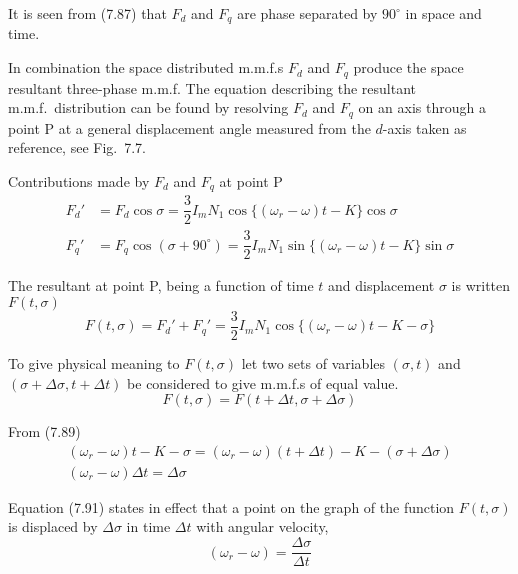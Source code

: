 \documentclass[a4paper,numbers=noenddot,12pt]{scrbook}
\begin{document}
        It is seen from (7.87) that $F_d$ and $F_q$ are phase separated by $90^{\circ}$ in space and time.

        In combination the space distributed m.m.f.s $F_d$ and $F_q$ produce the space resultant three-phase m.m.f. The equation describing the resultant m.m.f.\ distribution can be found by resolving $F_d$ and $F_q$ on an axis through a point P at a general displacement angle measured from the $d$-axis taken as reference, see Fig.\ 7.7.

        Contributions made by $F_d$ and $F_q$ at point P
        \begin{equation}
            \begin{aligned}
                F_d' & = F_d \cos \sigma = \dfrac{3}{2} I_m N_1 \cos \{(\omega_r - \omega)t - K\} \cos \sigma \\
                F_q' & = F_q \cos (\sigma + 90^{\circ}) = \dfrac{3}{2} I_m N_1 \sin \{(\omega_r - \omega)t - K\} \sin \sigma
            \end{aligned}
            \label{eq:Eq7.88}
        \end{equation}

        The resultant at point P, being a function of time $t$ and displacement $\sigma$ is written $F(t,\sigma)$
        \begin{equation}
            F(t,\sigma) = F_d'+F_q' = \dfrac{3}{2} I_m N_1 \cos \{ (\omega_r - \omega)t - K - \sigma\}
            \label{eq_Eq7.89}
        \end{equation}

        To give physical meaning to $F(t, \sigma)$ let two sets of variables $(\sigma, t)$ and $(\sigma + \Delta\sigma, t + \Delta t)$ be considered to give m.m.f.s of equal value.
        \begin{equation}
            F(t, \sigma)= F(t + \Delta t, \sigma + \Delta \sigma)
            \label{eq:Eq7.90}
        \end{equation}

        From (7.89)
        \begin{gather}
            (\omega_r - \omega)t - K -\sigma = (\omega_r -\omega)(t + \Delta t) - K - (\sigma +\Delta \sigma) \nonumber \\
            (\omega_r - \omega) \Delta t = \Delta \sigma
            \label{eq:Eq7.91}
        \end{gather}

        Equation (7.91) states in effect that a point on the graph of the function $F(t,\sigma)$ is displaced by $\Delta \sigma$ in time $\Delta t$ with angular velocity,
        \begin{equation}
            (\omega_r - \omega) = \dfrac{\Delta \sigma}{\Delta t}
            \label{eq:Eq7.92}
        \end{equation}
\end{document}
